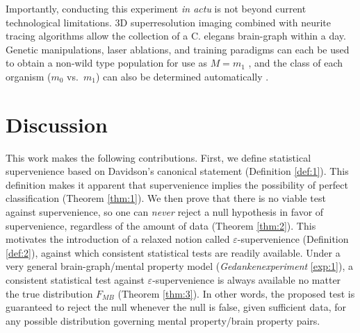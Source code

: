 \documentclass{article}
\newcommand{\eps}{\varepsilon}
\begin{document}
Importantly, conducting this experiment {\it in actu} is not beyond current technological limitations. 3D superresolution imaging \cite{Vaziri2008} combined with neurite tracing algorithms \cite{Helmstaedter2008,Mishchenko09,LuLichtman09} allow the collection of a C. elegans brain-graph within a day. Genetic manipulations, laser ablations, and training paradigms can each be used to obtain a non-wild type population for use as $M=m_1$ \cite{deBonoMaricq05}, and the class of each organism ($m_0$ vs.~$m_1$) can also be determined automatically \cite{Buckingham2008}.





\section*{Discussion}


This work makes the following contributions.  First, we define statistical supervenience based on Davidson's canonical statement (Definition \ref{def:1}).  This definition makes it apparent that supervenience implies the possibility of perfect classification (Theorem \ref{thm:1}).  
We then prove that there is no viable test against supervenience, so one can \emph{never} reject a null hypothesis in favor of supervenience, regardless of the amount of data (Theorem \ref{thm:2}).  This motivates the introduction of a relaxed notion called $\eps$-supervenience (Definition \ref{def:2}), against which consistent statistical tests are readily available. Under a very general brain-graph/mental property model (\emph{Gedankenexperiment} \ref{exp:1}),  a consistent statistical test against $\eps$-supervenience is always available no matter the true distribution $F_{MB}$ (Theorem \ref{thm:3}).  
In other words, the proposed test is guaranteed to reject the null whenever the null is false, given sufficient data, for any possible distribution governing mental property/brain property pairs. 
\end{document}
